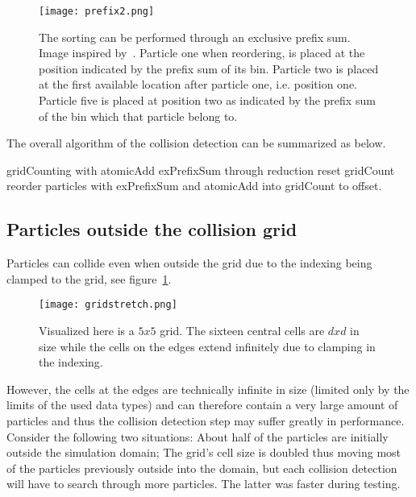 \begin{figure}[H]
  \centering
  \texttt{[image: prefix2.png]}
  \caption{The sorting can be performed through an exclusive prefix sum. Image inspired by~\cite{fastnearest}.
  Particle one when reordering, is placed at the position indicated by the prefix sum of its bin. Particle two is placed at the first available location after particle one, i.e. position one.
  Particle five is placed at position two as indicated by the prefix sum of the bin which that particle belong to.}
\end{figure}

The overall algorithm of the collision detection can be summarized as below.

\begin{algorithm}[H]
  \begin{algorithmic}[1]
  \State gridCounting with atomicAdd
  \State exPrefixSum through reduction
  \State reset gridCount
  \State reorder particles with exPrefixSum and atomicAdd into gridCount to offset.
  \end{algorithmic}
\end{algorithm}

\subsection{Particles outside the collision grid}
Particles can collide even when outside the grid due to the indexing
being clamped to the grid, see figure~\ref{fig:gridStretch}.

\begin{figure}[H]
  \centering
  \texttt{[image: gridstretch.png]}
  \caption{Visualized here is a $5x5$ grid. The sixteen central cells are $dxd$ in size while the cells on the edges extend infinitely due to clamping in the indexing.\label{fig:gridStretch}}
\end{figure}

However, the cells at the edges are technically infinite
in size (limited only by the limits of the used data types) and can therefore contain a very large amount of particles and thus the collision
detection step may suffer greatly in performance. Consider the following two situations:
About half of the particles are initially outside the simulation domain; The grid's
cell size is doubled thus moving most of the particles previously outside into the domain, but
each collision detection will have to search through more particles.
The latter was faster during testing.

